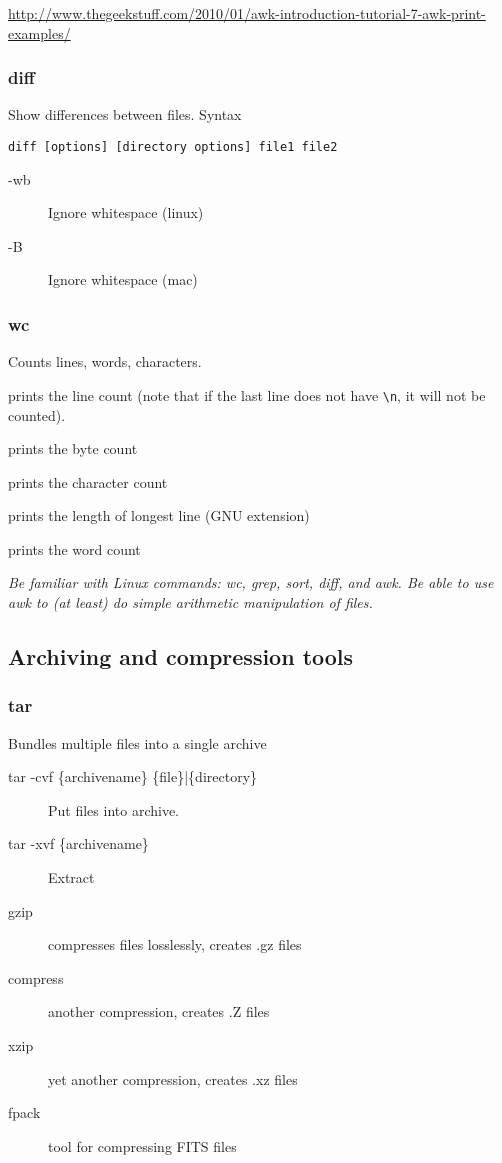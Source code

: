 \documentclass{article}
\newcommand{\test}[1]{%
    \begin{center}
        \colorbox{hl}{\parbox{0.9\textwidth}{\emph{#1}}}
    \end{center}}
\begin{document}
\url{http://www.thegeekstuff.com/2010/01/awk-introduction-tutorial-7-awk-print-examples/}

\subsubsection{\ttfamily diff}
Show differences between files. Syntax

\texttt{diff [options] [directory options] file1 file2}
\begin{description}
    \item [-wb] Ignore whitespace (linux)
    \item [-B] Ignore whitespace (mac)
\end{description}

\subsubsection{\ttfamily wc}
Counts lines, words, characters.
\begin{description}[labelwidth=8em, leftmargin=10em]
    \item [wc -l <filename>] prints the line count (note that if the last
        line does not have \verb|\n|, it will not be counted).
    \item [wc -c <filename>] prints the byte count
    \item [wc -m <filename>] prints the character count
    \item [wc -L <filename>] prints the length of longest line (GNU extension)
    \item [wc -w <filename>] prints the word count
\end{description}

\test{Be familiar with Linux commands: wc, grep, sort, diff, and awk.
Be able to use awk to (at least) do simple arithmetic manipulation of
files.}

\subsection{Archiving and compression tools}

\subsubsection{tar}
Bundles multiple files into a single archive
\begin{description}
    \item [tar -cvf \{archivename\} \{file\}|\{directory\}] Put files
        into archive.
    \item [tar -xvf \{archivename\}] Extract
    \item [gzip] compresses files losslessly, creates .gz files
    \item [compress] another compression, creates .Z files
    \item [xzip] yet another compression, creates .xz files
    \item [fpack] tool for compressing FITS files
\end{description}
\end{document}
